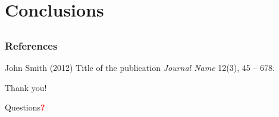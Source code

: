 \documentclass{beamer}
\begin{document}
\section{Conclusions}
\subsection{}

\begin{frame}
\frametitle{References}
\footnotesize{
\begin{thebibliography}{99} %
 John Smith (2012)
\newblock Title of the publication
\newblock \emph{Journal Name} 12(3), 45 -- 678.
\end{thebibliography}
}
\end{frame}


\begin{frame}
\Large
\centerline{Thank you!}
\medskip
\centerline{Questions\textcolor{red}{\textbf{?}}}
\end{frame}

\end{document}

